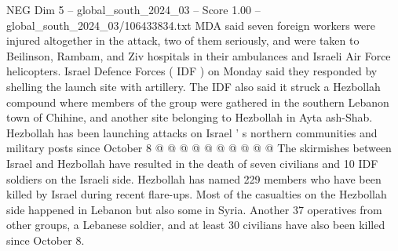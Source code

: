 \begin{textsample}{NEG Dim 5 – global\_south\_2024\_03 – Score 1.00 – global\_south\_2024\_03/106433834.txt}
MDA said seven foreign workers were injured altogether in the attack, two of them seriously, and were taken to Beilinson, Rambam, and Ziv hospitals in their ambulances and Israeli Air Force helicopters.
Israel Defence Forces ( IDF ) on Monday said they responded by shelling the launch site with artillery.
The IDF also said it struck a Hezbollah compound where members of the group were gathered in the southern Lebanon town of Chihine, and another site belonging to Hezbollah in Ayta ash-Shab.
Hezbollah has been launching attacks on Israel ' s northern communities and military posts since October 8 @ @ @ @ @ @ @ @ @ @ The skirmishes between Israel and Hezbollah have resulted in the death of seven civilians and 10 IDF soldiers on the Israeli side.
Hezbollah has named 229 members who have been killed by Israel during recent flare-ups.
Most of the casualties on the Hezbollah side happened in Lebanon but also some in Syria.
Another 37 operatives from other groups, a Lebanese soldier, and at least 30 civilians have also been killed since October 8.

\end{textsample}
